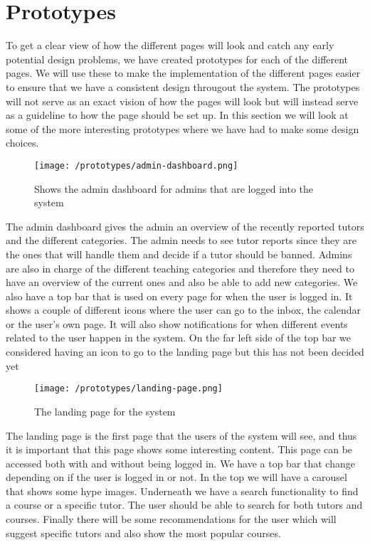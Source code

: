 \section{Prototypes}
To get a clear view of how the different pages will look and catch any early potential design problems, we have created prototypes for each of the different pages. 
We will use these to make the implementation of the different pages easier to ensure that we have a consistent design througout the system. 
The prototypes will not serve as an exact vision of how the pages will look but will instead serve as a guideline to how the page should be set up.
In this section we will look at some of the more interesting prototypes where we have had to make some design choices.
\begin{figure}[H]
    \texttt{[image: /prototypes/admin-dashboard.png]}
     \caption{Shows the admin dashboard for admins that are logged into the system}
     \label{fig:admin-dashboard}
 \end{figure}
The admin dashboard gives the admin an overview of the recently reported tutors and the different categories. 
The admin needs to see tutor reports since they are the ones that will handle them and decide if a tutor should be banned. 
Admins are also in charge of the different teaching categories and therefore they need to have an overview of the current ones and also be able to add new categories.
We also have a top bar that is used on every page for when the user is logged in. It shows a couple of different icons where the user can go to the inbox, the calendar or the user's own page. 
It will also show notifications for when different events related to the user happen in the system. 
On the far left side of the top bar we considered having an icon to go to the landing page but this has not been decided yet
\begin{figure}[H]
   \texttt{[image: /prototypes/landing-page.png]}
    \caption{The landing page for the system}
    \label{fig:landing-page}
\end{figure}
The landing page is the first page that the users of the system will see, and thus it is important that this page shows some interesting content. 
This page can be accessed both with and without being logged in. 
We have a top bar that change depending on if the user is logged in or not. 
In the top we will have a carousel that shows some hype images.
Underneath we have a search functionality to find a course or a specific tutor. 
The user should be able to search for both tutors and courses. 
Finally there will be some recommendations for the user which will suggest specific tutors and also show the most popular courses. 


